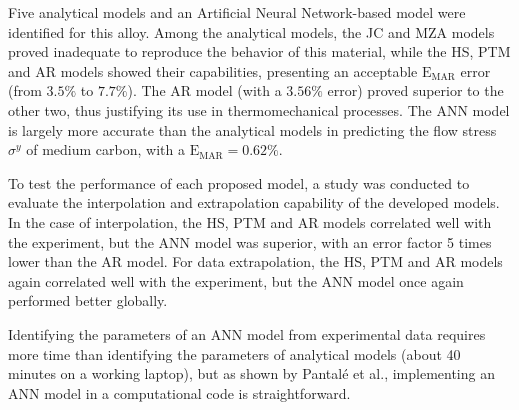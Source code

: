 \documentclass[metals,article,submit,pdftex,moreauthors]{Definitions/mdpi}
\makeatletter
\DeclareRobustCommand{\eal}{et al.\@\xspace}
\DeclareRobustCommand{\MARE}{\text{E}_\text{MAR}}
\makeatother
\begin{document}
Five analytical models and an Artificial Neural Network-based model were identified for this alloy.
Among the analytical models, the JC and MZA models proved inadequate to reproduce the behavior of this material, while the HS, PTM and AR models showed their capabilities, presenting an acceptable $\MARE$ error (from $3.5\%$ to $7.7\%$).
The AR model (with a $3.56\%$ error) proved superior to the other two, thus justifying its use in thermomechanical processes.
The ANN model is largely more accurate than the analytical models in predicting the flow stress $\sigma^y$ of medium carbon, with a $\MARE=0.62\%$.

To test the performance of each proposed model, a study was conducted to evaluate the interpolation and extrapolation capability of the developed models.
In the case of interpolation, the HS, PTM and AR models correlated well with the experiment, but the ANN model was superior, with an error factor 5 times lower than the AR model.
For data extrapolation, the HS, PTM and AR models again correlated well with the experiment, but the ANN model once again performed better globally.

Identifying the parameters of an ANN model from experimental data requires more time than identifying the parameters of analytical models (about 40 minutes on a working laptop), but as shown by Pantalé \eal \cite{Pantale-2021, Pantale-2023}, implementing an ANN model in a computational code is straightforward.

\vspace{6pt}



\end{document}
